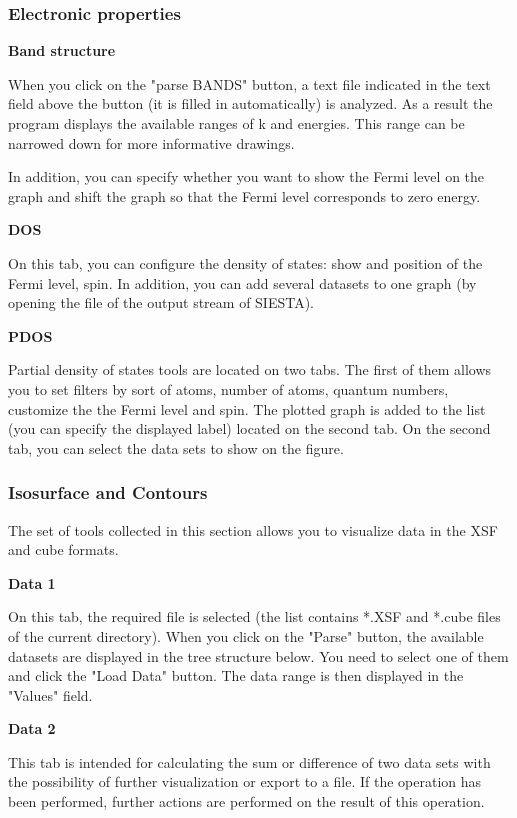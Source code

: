 \documentclass{article}
\begin{document}
\subsubsection{Electronic properties}

\textbf{Band structure}

When you click on the "parse BANDS" button, a text file indicated in the text field above the button (it is filled in automatically) is analyzed. As a result the program displays the available ranges of k and energies. This range can be narrowed down for more informative drawings.

In addition, you can specify whether you want to show the Fermi level on the graph and shift the graph so that the Fermi level corresponds to zero energy.

\textbf{DOS}

On this tab, you can configure the density of states: show and position of the Fermi level, spin. In addition, you can add several datasets to one graph (by opening the file of the output stream of SIESTA).

\textbf{PDOS}

Partial density of states tools are located on two tabs. The first of them allows you to set filters by sort of atoms, number of atoms, quantum numbers, customize the the Fermi level and spin. The plotted graph is added to the list (you can specify the displayed label) located on the second tab. On the second tab, you can select the data sets to show on the figure.



\subsubsection{Isosurface and Contours}

The set of tools collected in this section allows you to visualize data in the XSF and cube formats.

\textbf{Data 1}

On this tab, the required file is selected (the list contains *.XSF and *.cube files of the current directory). When you click on the "Parse" button, the available datasets are displayed in the tree structure below. You need to select one of them and click the "Load Data" button. The data range is then displayed in the "Values" field.


\textbf{Data 2}

This tab is intended for calculating the sum or difference of two data sets with the possibility of further visualization or export to a file. If the operation has been performed, further actions are performed on the result of this operation.
\end{document}
